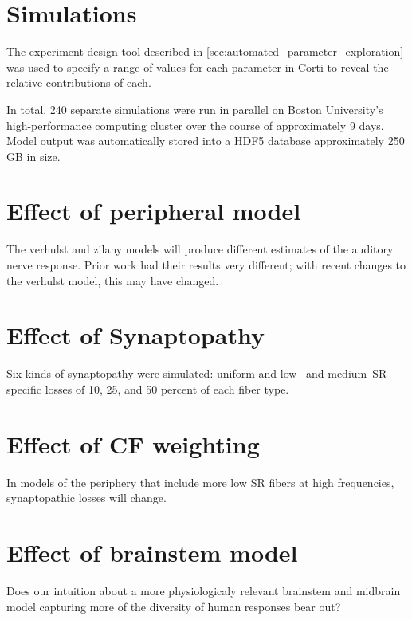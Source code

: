 \section{Simulations}
The experiment design tool described in \autoref{sec:automated_parameter_exploration} was used to specify a range of values for each parameter in Corti to reveal the relative contributions of each. 

In total, 240 separate simulations were run in parallel on Boston University's high-performance computing cluster over the course of approximately 9 days.  Model output was automatically stored into a HDF5 database approximately 250 GB in size.

\section{Effect of peripheral model} %
\label{sec:effect_of_peripheral_model}
The verhulst and zilany models will produce different estimates of the auditory nerve response. Prior work had their results very different; with recent changes to the verhulst model, this may have changed.

\section{Effect of Synaptopathy} %
\label{sec:effect_of_synaptopathy}
Six kinds of synaptopathy were simulated: uniform and low-- and medium--SR specific losses of 10, 25, and 50 percent of each fiber type. 

\section{Effect of CF weighting} %
\label{sec:effect_of_cf_weighting}
In models of the periphery that include more low SR fibers at high frequencies, synaptopathic losses will change.

\section{Effect of brainstem model} %
\label{sec:effect_of_brainstem_model}
Does our intuition about a more physiologicaly relevant brainstem and midbrain model capturing more of the diversity of human responses bear out? 
